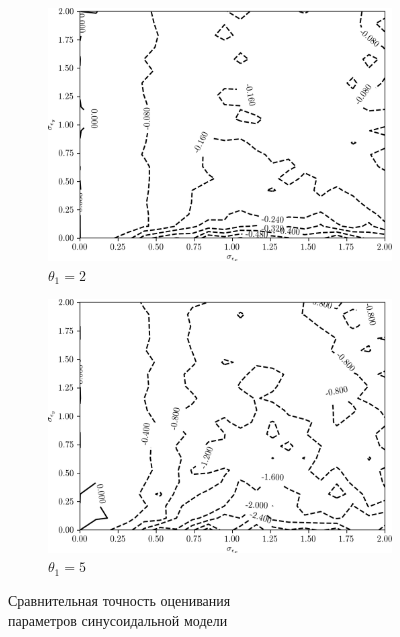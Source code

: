 \begin{figure}[p]
  \begin{subfigure}[b]{\linewidth}
    \centering
    \includegraphics[width=135mm]{fig/nonlinear/sinusoidal/a-0_b-2.png}
    \caption{\( \theta_1 = 2 \)}
  \end{subfigure}

  \vspace{2\baselineskip}
  \begin{subfigure}[b]{\linewidth}
    \centering
    \includegraphics[width=135mm]{fig/nonlinear/sinusoidal/a-0_b-10.png}
    \caption{\( \theta_1 = 5 \)}
  \end{subfigure}

  \vspace{\baselineskip}
  \caption{
    Сравнительная точность оценивания \\
    параметров синусоидальной модели
  }\label{fig:comparison_nonlinear_sinusoidal}
\end{figure}


